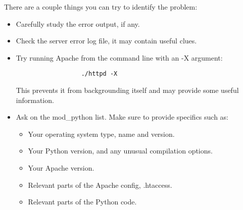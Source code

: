 There are a couple things you can try to identify the problem: 

\begin{itemize}

\item Carefully study the error output, if any. 

\item Check the server error log file, it may contain useful clues. 

\item Try running Apache from the command line with an -X argument: 
\begin{verbatim}
                  ./httpd -X
\end{verbatim}
This prevents it from backgrounding itself and may provide some useful information. 

\item
Ask on the mod_python list. Make sure to provide specifics such as:

\begin{itemize}

\item Your operating system type, name and version.
\item Your Python version, and any unusual compilation options.
\item Your Apache version.
\item Relevant parts of the Apache config, .htaccess.
\item Relevant parts of the Python code.

\end{itemize}

\end{itemize}